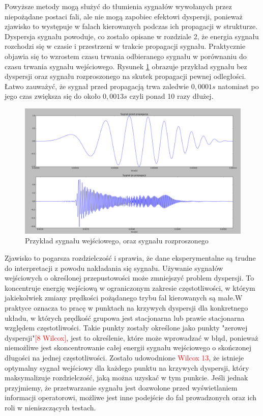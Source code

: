 Powyższe metody mogą służyć do tłumienia sygnałów wywołanych przez niepożądane postaci fali, ale nie mogą zapobiec efektowi dyspersji, ponieważ zjawisko to występuje w falach kierowanych podczas ich propagacji w strukturze. Dyspersja sygnału powoduje, co zostało opisane w rozdziale 2, że energia sygnału rozchodzi się w czasie i przestrzeni w trakcie propagacji sygnału. Praktycznie objawia się to wzrostem czasu trwania odbieranego sygnału w porównaniu do czasu trwania sygnału wejściowego. Rysunek \ref{fig:dyspersja} obrazuje przykład sygnału bez dyspersji oraz sygnału rozproszonego na skutek propagacji pewnej odległości. Łatwo zauważyć, że sygnał przed propagacją trwa zaledwie $0,0001 s$ natomiast po jego czas zwiększa się do około $0,0013s$ czyli ponad 10 razy dłużej.
\begin{figure}[h]
\centering
\includegraphics[width=14cm]{Zdjecia/4/dyspersja}
\caption{Przykład sygnału wejściowego, oraz sygnału rozproszonego}
\label{fig:dyspersja}
\end{figure}

 Zjawisko to pogarsza rozdzielczość i sprawia, że dane eksperymentalne są trudne do interpretacji z powodu nakładania się sygnału. Używanie sygnałów wejściowych o określonej przepustowości może zmniejszyć problem dyspersji. To koncentruje energię wejściową w ograniczonym zakresie częstotliwości, w którym jakiekolwiek zmiany prędkości pożądanego trybu fal kierowanych są małe.W praktyce oznacza to pracę w punktach na krzywych dyspersji dla konkretnego układu, w których prędkość grupowa jest stacjonarna lub prawie stacjonarna względem częstotliwości. Takie punkty zostały określone jako punkty "zerowej dyspersji"\textcolor{red}{[8 Wilcox]}, jest to określenie, które może wprowadzać w błąd, ponieważ niemożliwe jest skoncentrowanie całej energii sygnału wejściowego o skończonej długości na jednej częstotliwości. Zostało udowodnione \textcolor{red}{Wilcox 13}, że istnieje optymalny sygnał wejściowy dla każdego punktu na krzywych dyspersji, który maksymalizuje rozdzielczość, jaką można uzyskać w tym punkcie. Jeśli jednak przyjmiemy, że przetwarzanie sygnału jest dozwolone przed wyświetlaniem informacji operatorowi, możliwe jest inne podejście do fal prowadzonych oraz ich roli w nieniszczących testach.

